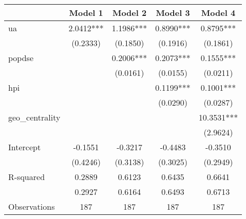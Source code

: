 \begin{table}
\caption{}
\begin{center}
\begin{tabular}{lcccc}
\hline
                &  Model 1  &  Model 2  &  Model 3  &  Model 4    \\
\midrule
ua              & 2.0412*** & 1.1986*** & 0.8990*** & 0.8795***   \\
                & (0.2333)  & (0.1850)  & (0.1916)  & (0.1861)    \\
popdse          &           & 0.2006*** & 0.2073*** & 0.1555***   \\
                &           & (0.0161)  & (0.0155)  & (0.0211)    \\
hpi             &           &           & 0.1199*** & 0.1001***   \\
                &           &           & (0.0290)  & (0.0287)    \\
geo\_centrality &           &           &           & 10.3531***  \\
                &           &           &           & (2.9624)    \\
Intercept       & -0.1551   & -0.3217   & -0.4483   & -0.3510     \\
                & (0.4246)  & (0.3138)  & (0.3025)  & (0.2949)    \\
R-squared       & 0.2889    & 0.6123    & 0.6435    & 0.6641      \\
                & 0.2927    & 0.6164    & 0.6493    & 0.6713      \\
Observations    & 187       & 187       & 187       & 187         \\
\hline
\end{tabular}
\end{center}
\end{table}